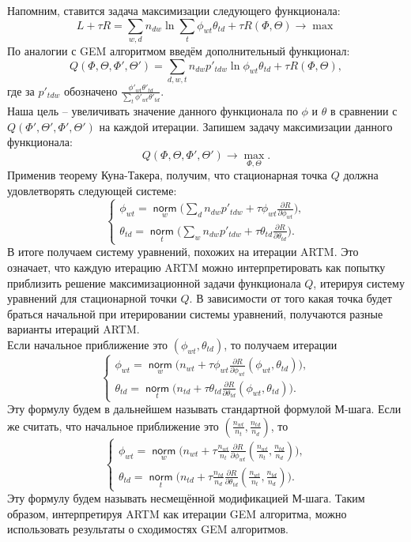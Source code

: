 \documentclass[12pt]{article}
\newcommand{\norm}{\mathop{\mathsf{norm}}\limits}
\begin{document}
	Напомним,  ставится задача максимизации следующего функционала:
\[
L + \tau R = \sum_{w,d} n_{dw} \ln\sum_t \phi_{wt} \theta_{td} + \tau R(\Phi, \Theta) \to \max
\]
По аналогии с GEM алгоритмом введём дополнительный функционал:
\[
	Q(\Phi, \Theta, \Phi', \Theta') = \sum\limits_{d, w, t} n_{dw} p'_{tdw} \ln{\phi_{wt}\theta_{td}} + \tau R(\Phi, \Theta),
\]
где за $p'_{tdw}$ обозначено $\frac{\phi'_{wt} \theta'_{td}}{\sum\limits_t \phi'_{wt} \theta'_{td}}$.\\
Наша цель -- увеличивать значение данного функционала по $\phi$ и $\theta$ в сравнении с $Q(\Phi', \Theta', \Phi', \Theta')$ на каждой итерации. Запишем задачу максимизации данного функционала:
\[
Q(\Phi, \Theta, \Phi', \Theta') \to \max_{\Phi, \Theta}.
\]
Применив теорему Куна-Такера,  получим, что стационарная точка $Q$ должна удовлетворять следующей системе:
\[
\left\{
	\begin{aligned}
		\phi_{wt}= \norm_w \bigg( \sum\limits_d n_{dw} p'_{tdw} + \tau\phi_{wt} \frac{\partial{R}}{\partial{\phi_{wt}}} \bigg),\\
		\theta_{td} = \norm_t \bigg( \sum\limits_w n_{dw} p'_{tdw} + \tau\theta_{td} \frac{\partial{R}}{\partial{\theta_{td}}} \bigg).
	\end{aligned}
\right.
\]
В итоге получаем систему уравнений, похожих на итерации ARTM. Это означает, что каждую итерацию ARTM можно интерпретировать как попытку приблизить решение максимизационной задачи функционала $Q$, итерируя систему уравнений для стационарной точки $Q$. В зависимости от того какая точка будет браться начальной при итерировании системы уравнений, получаются разные варианты итераций ARTM.\\
Если начальное приближение это $(\phi_{wt}, \theta_{td})$, то получаем итерации
\[
\left\{
	\begin{aligned}
		\phi_{wt} = \norm_w \bigg( n_{wt} + \tau\phi_{wt} \frac{\partial{R}}{\partial{\phi_{wt}}} \left( \phi_{wt}, \theta_{td}\right) \bigg),\\
		\theta_{td} = \norm_t \bigg( n_{td} + \tau\theta_{td} \frac{\partial{R}}{\partial{\theta_{td}}} \left( \phi_{wt}, \theta_{td}\right) \bigg).
	\end{aligned}
\right.
\]
Эту формулу будем в дальнейшем называть стандартной формулой М-шага. Если же считать, что начальное приближение это $(\frac{n_{wt}}{n_t}, \frac{n_{td}}{n_d})$, то
\[
\left\{
	\begin{aligned}
		\phi_{wt}= \norm_w \bigg( n_{wt} + \tau \frac{n_{wt}}{n_t} \frac{\partial{R}}{\partial{\phi_{wt}}} \left(\frac{n_{wt}}{n_t}, \frac{n_{td}}{n_d}\right) \bigg),\\
		\theta_{td} = \norm_t \bigg(n_{td} + \tau \frac{n_{td}}{n_d} \frac{\partial{R}}{\partial{\theta_{td}}} \left(\frac{n_{wt}}{n_t}, \frac{n_{td}}{n_d}\right) \bigg).
	\end{aligned}
\right.
\]
Эту формулу будем называть несмещённой модификацией М-шага. Таким образом, интерпретируя ARTM как итерации GEM алгоритма, можно использовать результаты о сходимостях GEM алгоритмов.
\end{document}
